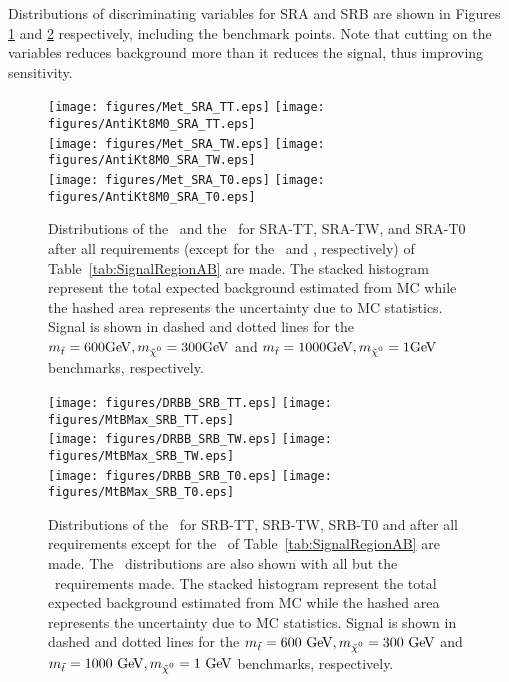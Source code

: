 Distributions of discriminating variables for SRA and SRB are shown in Figures \ref{fig:SRAMetAntiKt8M} and \ref{fig:SRBDRBBMtBMax} respectively, including the benchmark points.  Note that cutting on the variables reduces background more than it reduces the signal, thus improving sensitivity.  \\

\begin{figure}[htb]
	\begin{center}
		\texttt{[image: figures/Met\_SRA\_TT.eps]} 
		\texttt{[image: figures/AntiKt8M0\_SRA\_TT.eps]} \\
		\texttt{[image: figures/Met\_SRA\_TW.eps]} 
		\texttt{[image: figures/AntiKt8M0\_SRA\_TW.eps]} \\
		\texttt{[image: figures/Met\_SRA\_T0.eps]} 
		\texttt{[image: figures/AntiKt8M0\_SRA\_T0.eps]} \\
		\caption[Distributions of the \met\ and the \mantikteightzero\ for SRA]{\label{fig:SRAMetAntiKt8M} Distributions of the \met\ and the \mantikteightzero\ for SRA-TT, SRA-TW, and SRA-T0 after all requirements (except for the \met\ and \mantikteightzero, respectively) of Table~\ref{tab:SignalRegionAB} are made. The stacked histogram represent the total expected background estimated from MC while the hashed area represents the uncertainty due to MC statistics. Signal is shown in dashed and dotted lines for the $\mstop=600\gev,\mLSP=300\gev$ and $\mstop=1000\gev,\mLSP=1\gev$ benchmarks, respectively. }
	\end{center}
\end{figure}

\begin{figure}[!htb]
	\begin{center}
		\texttt{[image: figures/DRBB\_SRB\_TT.eps]}
		\texttt{[image: figures/MtBMax\_SRB\_TT.eps]}\\
		\texttt{[image: figures/DRBB\_SRB\_TW.eps]}
		\texttt{[image: figures/MtBMax\_SRB\_TW.eps]}\\
		\texttt{[image: figures/DRBB\_SRB\_T0.eps]}
		\texttt{[image: figures/MtBMax\_SRB\_T0.eps]}\\
		\caption[Distributions of the \drbb\ and the \mtbmax\ for SRB]{\label{fig:SRBDRBBMtBMax} Distributions of the \drbb\ for SRB-TT, SRB-TW, SRB-T0 and after all requirements except for the \drbb\ of Table~\ref{tab:SignalRegionAB} are made. The \mtbmax\ distributions are also shown with all but the \mtbmax\ requirements made.  The stacked histogram represent the total expected background estimated from MC while the hashed area represents the uncertainty due to MC statistics. Signal is shown in dashed and dotted lines for the $\mstop=600~\gev,\mLSP=300~\gev$ and $\mstop=1000~\gev,\mLSP=1~\gev$ benchmarks, respectively. }
	\end{center}
\end{figure}


